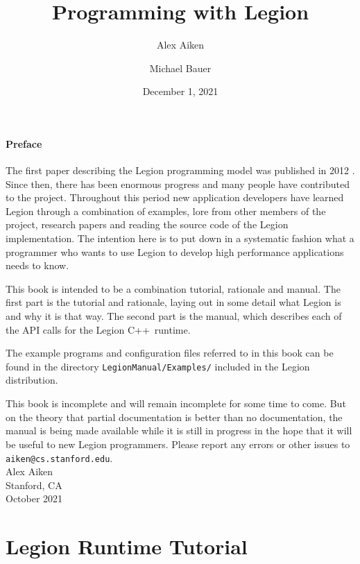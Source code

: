 \documentclass[11pt]{book}
\newcommand{\legionbook}[1]{{\tt LegionManual/Examples/#1}}
\newcommand{\Cpp}{C++}
\begin{document}
\title{Programming with Legion}
\author{Alex Aiken \and Michael Bauer}
\date{December 1, 2021}
\maketitle

\subsection*{Preface}

The first paper describing the Legion programming model
was published in 2012 \cite{Legion12}.  Since then, there has been
enormous progress and many people have contributed to
the project.  Throughout this period new application developers have
learned Legion through a combination of examples, lore from other
members of the project, research papers and reading the source code of
the Legion implementation.  The intention here is to put down in 
a systematic fashion what a programmer who wants to use
Legion to develop high performance applications needs to know.

This book is intended to be a combination tutorial, rationale and
manual.  The first part is the tutorial and rationale, laying out in some
detail what Legion is and why it is that way.  The second part is the manual, which describes
each of the API calls for the Legion \Cpp\ runtime.

The example programs and configuration files referred to in this book can be found in the directory
\legionbook{} included in the Legion distribution.

This book is incomplete and will remain incomplete for
some time to come.  But on the theory that partial documentation is better than no
documentation, the manual is being made available while it is
still in progress in the hope that it will be useful to new Legion
programmers.  Please report any errors or other issues to {\tt
  aiken@cs.stanford.edu}. \\[2in] Alex Aiken\\ Stanford, CA \\
October 2021

\tableofcontents

\part{Legion Runtime Tutorial}











\end{document}
